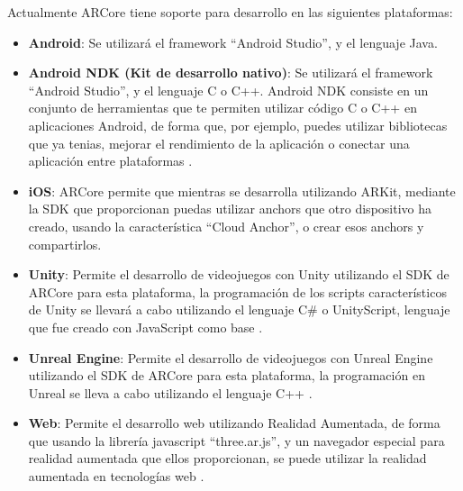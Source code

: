 Actualmente ARCore tiene soporte para desarrollo en las siguientes plataformas:

\begin{itemize}
  \item \textbf{Android}: Se utilizará el framework “Android Studio”, y el lenguaje Java.

  \item \textbf{Android NDK (Kit de desarrollo nativo)}: Se utilizará el framework “Android Studio”, y el lenguaje C o C++. Android NDK consiste en un conjunto de herramientas que te permiten utilizar código C o C++ en aplicaciones Android, de forma que, por ejemplo, puedes utilizar bibliotecas que ya tenias, mejorar el rendimiento de la aplicación o conectar una aplicación entre plataformas \cite{ndk}.

  \item \textbf{iOS}: ARCore permite que mientras se desarrolla utilizando ARKit, mediante la SDK que proporcionan puedas utilizar anchors que otro dispositivo ha creado, usando la característica “Cloud Anchor”, o crear esos anchors y compartirlos.

  \item \textbf{Unity}: Permite el desarrollo de videojuegos con Unity utilizando el SDK de ARCore para esta plataforma, la programación de los scripts característicos de Unity se llevará a cabo utilizando el lenguaje C# o UnityScript, lenguaje que fue creado con JavaScript como base \cite{unity-scripting}.

  \item \textbf{Unreal Engine}: Permite el desarrollo de videojuegos con Unreal Engine utilizando el SDK de ARCore para esta plataforma, la programación en Unreal se lleva a cabo utilizando el lenguaje C++ \cite{unreal}.

  \item \textbf{Web}: Permite el desarrollo web utilizando Realidad Aumentada, de forma que usando la librería javascript “three.ar.js”, y un navegador especial para realidad aumentada que ellos proporcionan, se puede utilizar la realidad aumentada en tecnologías web \cite{arcore-web}.
\end{itemize}

